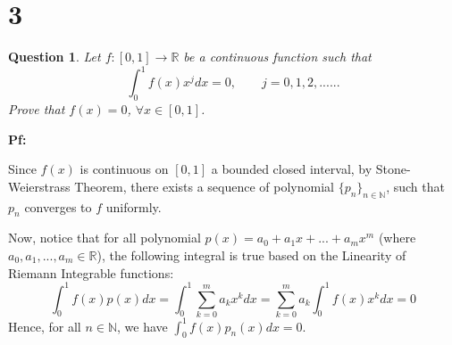 \documentclass{article}
\newtheorem{question}{Question}
\begin{document}
\begin{comment}
\hfill

\textbf{Sequence of Polynomials Converging to $f^{(3)}$ and $f^{(2)}$:}

Given that $f^{(3)}$ is continuous on $[0,1]$, then by Stone-Weierstrass Theorem, there exists a sequence of polynomial $\{p_n\}_{n\in\mathbb{N}}$ that converges uniformly to $f^{(3)}$.
Which, for all $n\in\mathbb{N}$, let $p_{1,n}:[0,1]\rightarrow\mathbb{R}$ be an antiderivative of $p_n$ that satisfies $p_{1,n}(0) = f''(0)$. 

Then, since $p_{1,n}' = p_n$ converges to $(f'')' = f^{(3)}$, and $\lim_{n\rightarrow\infty}p_{1,n}(0) = \lim_{n\rightarrow\infty}f''(0) = f''(0)$,
then we can conclude that $p_{1,n}$ must converge to $f''$ uniformly (since the derivatives converge uniformly to the derivative of $f''$, and there is a point converging to $f''$).

\hfill

\textbf{Sequence of Polynomials Converging to the other Functions:}
\end{comment}

\break

\section*{3}
\begin{myBox}[]{}
    \begin{question}
        Let $f:[0,1]\rightarrow\mathbb{R}$ be a continuous function such that
        $$\int_{0}^{1}f(x)x^jdx = 0,\quad\quad j=0,1,2,......$$
        Prove that $f(x)=0$, $\forall x\in[0,1]$.
    \end{question}
\end{myBox}

\textbf{Pf:}

Since $f(x)$ is continuous on $[0,1]$ a bounded closed interval, by Stone-Weierstrass Theorem, there exists a sequence of polynomial $\{p_n\}_{n\in\mathbb{N}}$, such that $p_n$ converges to $f$ uniformly.

Now, notice that for all polynomial $p(x)=a_0+a_1x+...+a_mx^m$ (where $a_0,a_1,...,a_m\in\mathbb{R}$), the following integral is true based on the Linearity of Riemann Integrable functions:
$$\int_{0}^{1}f(x)p(x)dx = \int_{0}^{1}\sum_{k=0}^{m}a_kx^kdx = \sum_{k=0}^{m}a_k\int_{0}^{1}f(x)x^kdx = 0$$
Hence, for all $n\in\mathbb{N}$, we have $\int_{0}^{1}f(x)p_n(x)dx = 0$.

\hfill
\end{document}
